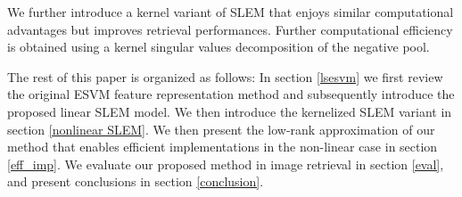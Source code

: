 We further introduce a kernel variant of SLEM that enjoys similar computational advantages but improves retrieval performances. Further computational efficiency is obtained using a kernel singular values decomposition of the negative pool.

The rest of this paper is organized as follows:
In section \ref{lsesvm} we first review the original ESVM feature representation method and subsequently introduce the proposed linear SLEM model. We then introduce the kernelized SLEM variant in section \ref{nonlinear SLEM}. We then present the low-rank approximation of our method that enables efficient implementations in the non-linear case in section \ref{eff_imp}. We evaluate our proposed method in image retrieval in section \ref{eval}, and present conclusions in section \ref{conclusion}.










